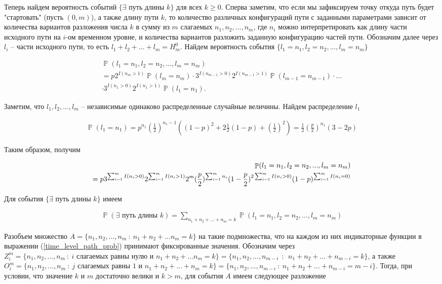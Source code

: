 \documentclass[10pt, reqno]{amsart}
\DeclareMathOperator*{\Pb}{\mathbb{P}}
\begin{document}
  Теперь найдем вероятность событий $\{\exists \text{ путь длины } k\}$ для всех $k \geq 0$. Сперва заметим, что если мы зафиксируем точку откуда путь будет "стартовать" (пусть $(0,m)$), а также длину пути $k$, то количество различных конфигураций пути с заданными параметрами зависит от количества вариантов разложения числа $k$ в сумму из $m$ слагаемых $n_{1}, n_{2},...,n_{m}$, где $n_{i}$ можно интерпретировать как длину части исходного пути на $i$-ом временном уровне, и количества вариантов разложить заданную конфигурацию частей пути. Обозначим далее через $l_{i}$ -- части исходного пути, то есть $l_{1}+l_{2}+...+l_{m} = H_{m}^{0}$. Найдем вероятность события $\{l_{1}=n_{1}, l_{2}=n_{2},..., l_{m}=n_{m}\}$
  
  \begin{align*}
    \Pb(l_{1}=n_{1}, l_{2}=n_{2},..., l_{m}=n_{m}) \\ = p2^{I(n_{m}>1)}\Pb(l_{m}=n_{m})\cdot3^{I(n_{m-1}>0)}2^{I(n_{m-1}>1)}\Pb(l_{m-1}=n_{m-1})\cdot...\\ \cdot3^{I(n_{1}>0)}2^{I(n_{1}>1)}\Pb(l_{1}=n_{1}).
  \end{align*}
  
  Заметим, что $l_{1}, l_{2},..., l_{m}$ -- независимые одинаково распределенные случайные величины. Найдем распределение $l_{1}$
  
  \begin{align*}
    \Pb(l_{1} = n_{1}) = p^{n_{1}}(\frac{1}{2})^{n_{1}-1}((1-p)^{2} + 2\frac{1}{2}(1-p) + (\frac{1}{2})^{2}) = \frac{1}{2}(\frac{p}{2})^{n_{1}}(3-2p)
  \end{align*}
  
  Таким образом, получим
  
  \begin{align}
    \Pb(l_{1}=n_{1}, l_{2}=n_{2},..., l_{m}=n_{m}) \notag\\ = p3^{\sum_{i=1}^{m}I(n_{i}>0)}2^{\sum_{i=1}^{m}I(n_{i}>1)}2^{m}(\frac{p}{2})^{\sum_{i=1}^{m}n_{i}}(1-\frac{p}{2})^{2\sum_{i=1}^{m}I(n_{i}>0)}(1-p)^{\sum_{i=1}^{m}I(n_{i}=0)}
    \label{time_level_path_prob}
  \end{align}
  
  Для события $\{\exists \text{ путь длины } k\}$ имеем
  
  \begin{align*}
    \Pb(\exists \text{ путь длины } k) = \sum_{n_{1}+n_{2}+...+n_{m} = k}\Pb(l_{1}=n_{1}, l_{2}=n_{2},..., l_{m}=n_{m})
  \end{align*}
  
  Разобъем множество $A = \{n_{1}, n_{2},..., n_{m} \: : \: n_{1}+n_{2}+...n_{m}=k\}$ на такие подмножества, что на каждом из них индикаторные функции в выражении (\ref{time_level_path_prob}) принимают фиксированные значения. Обозначим через $Z_{i}^{m} = \{n_{1}, n_{2},..., n_{m} \: : \: i \text{ слагаемых равны нулю и } n_{1}+n_{2}+...n_{m}=k\} = \{n_{1}, n_{2},..., n_{m-i} \:\: : \:\: n_{1}+n_{2}+...+n_{m-i}=k\}$, а также $O_{i}^{m} = \{n_{1}, n_{2},..., n_{m} \: : \: j \text{ слагаемых равны } 1 \text{ и } n_{1}+n_{2}+...+n_{m}=k\} = \{n_{1}, n_{2},..., n_{m-i} \: : \: n_{1}+n_{2}+...+n_{m-i}=m-i\}$. Тогда, при условии, что значение $k$ и $m$ достаточно велики и $k > m$, для события $A$ имеем следующее разложение
  
\end{document}
